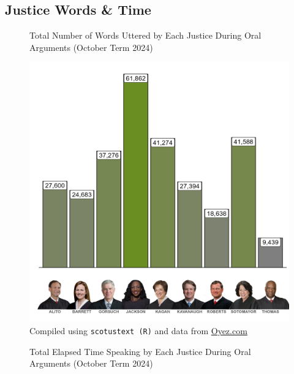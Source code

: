 \begin{landscape}  %

\subsection{Justice Words \& Time}


\begin{figure}[!htb]
\centering  %
\begin{minipage}{0.6\textwidth}  %
    \centering
    \caption{Total Number of Words Uttered by Each Justice During Oral Arguments (October Term 2024)}
    \vspace{2mm}
    \includegraphics[width=1.1\textwidth]{../oral_arguments/analyses/Combined/justice_words_combined.png}
    \small{Compiled using \texttt{scotustext (R)} and data from \textcolor{blue}{\href{https://www.oyez.org/}{Oyez.com}}}
\end{minipage}
\hspace{10mm}  %
\begin{minipage}{0.6\textwidth}  %
    \centering
    \caption{Total Elapsed Time Speaking by Each Justice During Oral Arguments (October Term 2024)}
    \vspace{2mm}

\end{minipage}
\end{figure}
\end{landscape}

